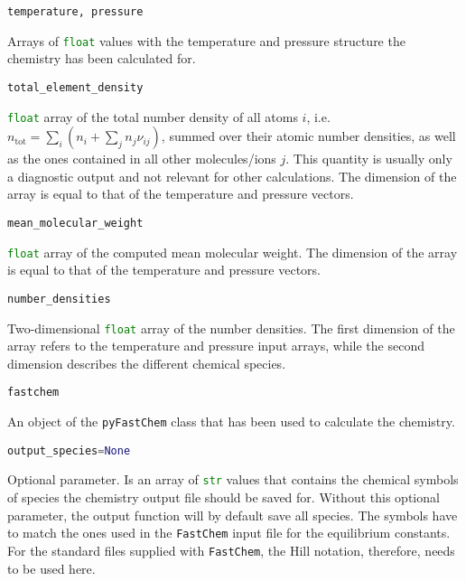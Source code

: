 \documentclass[numbers=noenddot]{fcmanual}
\newcommand{\fc}{\texttt{FastChem}\xspace}
\newcommand{\pfc}{\texttt{pyFastChem}\xspace}
\begin{document}
\bigbreak

\lstinline[language=Python]!temperature, pressure!
\begin{addmargin}[25pt]{0pt}
	Arrays of \lstinline[language=Python]!float! values with the temperature and pressure structure the chemistry has been calculated for.
\end{addmargin}

\bigbreak

\lstinline[language=Python]!total_element_density!
\begin{addmargin}[25pt]{0pt}
	\lstinline[language=Python]!float! array of the total number density of all atoms $i$, i.e. $n_\mathrm{tot} = \sum_i \left( n_i + \sum_j n_j \nu_{ij} \right)$, summed over their atomic number densities, as well as the ones contained in all other molecules/ions $j$. This quantity is usually only a diagnostic output and not relevant for other calculations. The dimension of the array is equal to that of the temperature and pressure vectors.
\end{addmargin}

\bigbreak

\lstinline[language=Python]!mean_molecular_weight!
\begin{addmargin}[25pt]{0pt}
	\lstinline[language=Python]!float! array of the computed mean molecular weight. The dimension of the array is equal to that of the temperature and pressure vectors.
\end{addmargin}


\bigbreak

\lstinline[language=Python]!number_densities!
\begin{addmargin}[25pt]{0pt}
	Two-dimensional \lstinline[language=Python]!float! array of the number densities. The first dimension of the array refers to the temperature and pressure input arrays, while the second dimension describes the different chemical species.
\end{addmargin}


\bigbreak

\lstinline[language=Python]!fastchem!
\begin{addmargin}[25pt]{0pt}
	An object of the \pfc class that has been used to calculate the chemistry. 
\end{addmargin}


\bigbreak

\lstinline[language=Python]!output_species=None!
\begin{addmargin}[25pt]{0pt}
	Optional parameter. Is an array of \lstinline[language=Python]!str! values that contains the chemical symbols of species the chemistry output file should be saved for. Without this optional parameter, the output function will by default save all species. The symbols have to match the ones used in the \fc input file for the equilibrium constants. For the standard files supplied with \fc, the Hill notation, therefore, needs to be used here.
\end{addmargin}
\end{document}
